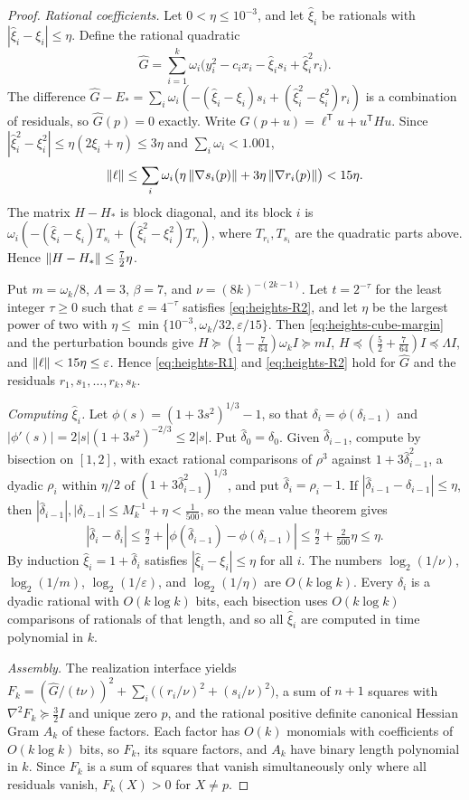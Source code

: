 \begin{proof}
\emph{Rational coefficients.} Let $0<\eta\le10^{-3}$, and let $\hat\xi_i$ be
rationals with $|\hat\xi_i-\xi_i|\le\eta$. Define the rational quadratic
\[
 \hat G=\sum_{i=1}^k\omega_i\bigl(y_i^2-c_ix_i-\hat\xi_is_i
          +\hat\xi_i^2r_i\bigr).
\]
The difference
$\hat G-E_*=\sum_i\omega_i(-(\hat\xi_i-\xi_i)s_i+(\hat\xi_i^2-\xi_i^2)r_i)$
is a combination of residuals, so $\hat G(p)=0$ exactly. Write
$\hat G(p+u)=\ell^{\mathsf T}u+u^{\mathsf T}Hu$. Since
$|\hat\xi_i^2-\xi_i^2|\le\eta(2\xi_i+\eta)\le3\eta$ and
$\sum_i\omega_i<1.001$,
\[
 \left\lVert\ell\right\rVert\le\sum_i\omega_i\bigl(\eta\left\lVert\nabla s_i(p)\right\rVert
     +3\eta\left\lVert\nabla r_i(p)\right\rVert\bigr)<15\eta.
\]
The matrix $H-H_*$ is block diagonal, and its block $i$ is
$\omega_i(-(\hat\xi_i-\xi_i)T_{s_i}+(\hat\xi_i^2-\xi_i^2)T_{r_i})$, where
$T_{r_i},T_{s_i}$ are the quadratic parts above. Hence
$\left\lVert H-H_*\right\rVert\le\frac72\eta$.

Put $m=\omega_k/8$, $\Lambda=3$, $\beta=7$, and $\nu=(8k)^{-(2k-1)}$. Let $t=2^{-\tau}$ for the least integer $\tau\ge0$ such that
$\varepsilon=4^{-\tau}$ satisfies \eqref{eq:heights-R2}, and let $\eta$ be the
largest power of two with $\eta\le\min\{10^{-3},\omega_k/32,\varepsilon/15\}$.
Then \eqref{eq:heights-cube-margin} and the perturbation bounds give
$H\succeq(\frac14-\frac7{64})\omega_kI\succeq mI$,
$H\preceq(\frac52+\frac7{64})I\preceq\Lambda I$, and
$\left\lVert\ell\right\rVert<15\eta\le\varepsilon$. Hence \eqref{eq:heights-R1} and
\eqref{eq:heights-R2} hold for $\hat G$ and the residuals
$r_1,s_1,\ldots,r_k,s_k$.

\emph{Computing $\hat\xi_i$.} Let $\phi(s)=(1+3s^2)^{1/3}-1$, so that
$\delta_i=\phi(\delta_{i-1})$ and $|\phi'(s)|=2|s|(1+3s^2)^{-2/3}\le2|s|$. Put
$\hat\delta_0=\delta_0$. Given $\hat\delta_{i-1}$, compute by bisection on
$[1,2]$, with exact rational comparisons of $\rho^3$ against
$1+3\hat\delta_{i-1}^2$, a dyadic $\rho_i$ within $\eta/2$ of
$(1+3\hat\delta_{i-1}^2)^{1/3}$, and put $\hat\delta_i=\rho_i-1$. If
$|\hat\delta_{i-1}-\delta_{i-1}|\le\eta$, then
$|\hat\delta_{i-1}|,|\delta_{i-1}|\le M_k^{-1}+\eta<\frac1{500}$, so the mean
value theorem gives
\[
 |\hat\delta_i-\delta_i|\le\tfrac\eta2
   +|\phi(\hat\delta_{i-1})-\phi(\delta_{i-1})|
 \le\tfrac\eta2+\tfrac2{500}\eta\le\eta.
\]
By induction $\hat\xi_i=1+\hat\delta_i$ satisfies $|\hat\xi_i-\xi_i|\le\eta$
for all $i$. The numbers $\log_2(1/\nu)$, $\log_2(1/m)$, $\log_2(1/\varepsilon)$,
and $\log_2(1/\eta)$ are $O(k\log k)$. Every $\hat\delta_i$ is a dyadic rational
with $O(k\log k)$ bits, each bisection uses $O(k\log k)$ comparisons of
rationals of that length, and so all $\hat\xi_i$ are computed in time
polynomial in $k$.

\emph{Assembly.} The realization interface yields
$F_k=(\hat G/(t\nu))^2+\sum_i\bigl((r_i/\nu)^2+(s_i/\nu)^2\bigr)$, a sum of
$n+1$ squares with $\nabla^2F_k\succeq\frac32I$ and unique zero $p$, and the
rational positive definite canonical Hessian Gram $A_k$ of these factors.
Each factor has $O(k)$ monomials with coefficients of $O(k\log k)$ bits, so
$F_k$, its square factors, and $A_k$ have binary length polynomial in $k$.
Since $F_k$ is a sum of squares that vanish simultaneously only where all
residuals vanish, $F_k(X)>0$ for $X\ne p$.
\end{proof}

